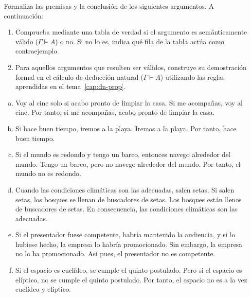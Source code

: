 \begin{pregunta}\label{e2-arg}
Formaliza las premisas y la conclusión de los siguientes argumentos. A continuación:
\begin{enumerate}[1.]
    \item Comprueba mediante una tabla de verdad si el argumento es semánticamente válido ($\Gamma \models A$) o no. Si no lo es, indica qué fila de la tabla actúa como contraejemplo.
    \item Para aquellos argumentos que resulten ser válidos,
      construye su demostración formal en el cálculo de
        deducción natural ($\Gamma \vdash A$) utilizando las reglas
      aprendidas en el tema~\ref{cap:dn-prop}.
\end{enumerate}

\begin{enumerate}[(a)]
    \item Voy al cine solo si acabo pronto de limpiar la casa. Si me acompañas, voy al cine. Por tanto, si me acompañas, acabo pronto de limpiar la casa.
    \item Si hace buen tiempo, iremos a la playa. Iremos a la playa. Por tanto, hace buen tiempo.
    \item Si el mundo es redondo y tengo un barco, entonces navego alrededor del mundo. Tengo un barco, pero no navego alrededor del mundo. Por tanto, el mundo no es redondo.
    \item Cuando las condiciones climáticas son las adecuadas, salen setas. Si salen setas, los bosques se llenan de buscadores de setas. Los bosques están llenos de buscadores de setas. En consecuencia, las condiciones climáticas son las adecuadas.
    \item Si el presentador fuese competente, habría mantenido la audiencia, y si lo hubiese hecho, la empresa lo habría promocionado. Sin embargo, la empresa no lo ha promocionado. Así pues, el presentador no es competente.
    \item Si el espacio es euclídeo, se cumple el quinto postulado. Pero si el espacio es elíptico, no se cumple el quinto postulado. Por tanto, el espacio no es a la vez euclídeo y elíptico.
\end{enumerate}
\end{pregunta}


